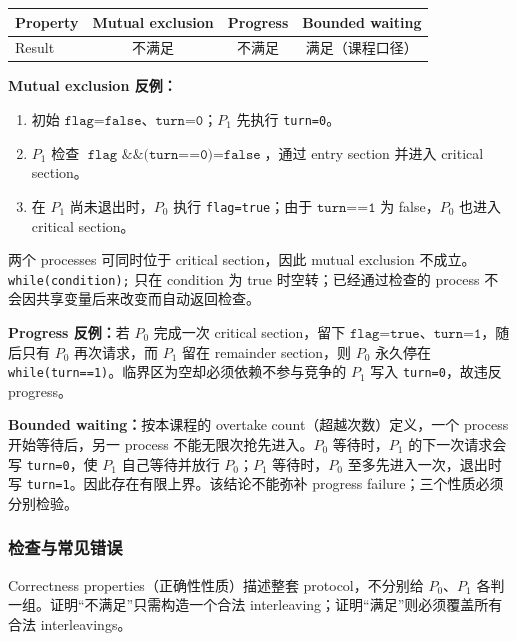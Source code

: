 \begin{checkedsolution}
\begin{center}
\small
\begin{tabular}{@{}lccc@{}}
  \toprule
  Property & Mutual exclusion & Progress & Bounded waiting \\
  \midrule
  Result & 不满足 & 不满足 & 满足（课程口径） \\
  \bottomrule
\end{tabular}
\end{center}

\textbf{Mutual exclusion 反例：}
\begin{enumerate}[leftmargin=2.2em]
  \item 初始 $\texttt{flag=false}$、$\texttt{turn=0}$；$P_1$ 先执行 \texttt{turn=0}。
  \item $P_1$ 检查 $\texttt{flag \&\& (turn==0)}=\texttt{false}$，通过 entry section 并进入 critical section。
  \item 在 $P_1$ 尚未退出时，$P_0$ 执行 \texttt{flag=true}；由于 $\texttt{turn==1}$ 为 false，$P_0$ 也进入 critical section。
\end{enumerate}
两个 processes 可同时位于 critical section，因此 mutual exclusion 不成立。\texttt{while(condition);} 只在 condition 为 true 时空转；已经通过检查的 process 不会因共享变量后来改变而自动返回检查。

\textbf{Progress 反例：}若 $P_0$ 完成一次 critical section，留下 $\texttt{flag=true}$、$\texttt{turn=1}$，随后只有 $P_0$ 再次请求，而 $P_1$ 留在 remainder section，则 $P_0$ 永久停在 \texttt{while(turn==1)}。临界区为空却必须依赖不参与竞争的 $P_1$ 写入 \texttt{turn=0}，故违反 progress。

\textbf{Bounded waiting：}按本课程的 overtake count（超越次数）定义，一个 process 开始等待后，另一 process 不能无限次抢先进入。$P_0$ 等待时，$P_1$ 的下一次请求会写 \texttt{turn=0}，使 $P_1$ 自己等待并放行 $P_0$；$P_1$ 等待时，$P_0$ 至多先进入一次，退出时写 \texttt{turn=1}。因此存在有限上界。该结论不能弥补 progress failure；三个性质必须分别检验。
\end{checkedsolution}

\subsubsection*{检查与常见错误}

Correctness properties（正确性性质）描述整套 protocol，不分别给 $P_0$、$P_1$ 各判一组。证明“不满足”只需构造一个合法 interleaving；证明“满足”则必须覆盖所有合法 interleavings。


